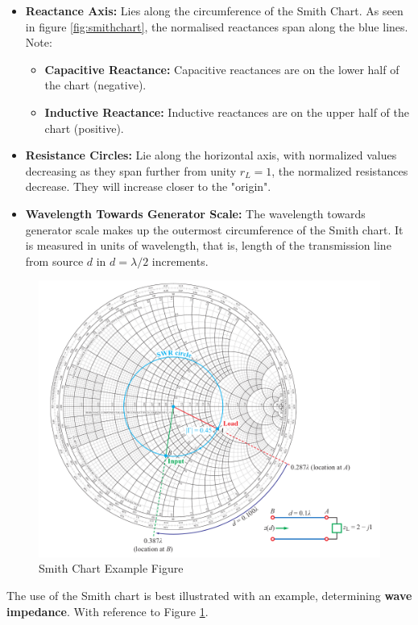 \documentclass{book}
\begin{document}
\begin{itemize}
	\item \textbf{Reactance Axis:} Lies along the circumference of the Smith Chart. As seen in figure \ref{fig:smithchart}, the normalised reactances span along the blue lines. Note:
	\begin{itemize}
		\item \textbf{Capacitive Reactance:} Capacitive reactances are on the lower half of the chart (negative).
		\item \textbf{Inductive Reactance:} Inductive reactances are on the upper half of the chart (positive).
	\end{itemize}
	\item \textbf{Resistance Circles:} Lie along the horizontal axis, with normalized values decreasing as they span further from unity $r_L = 1$, the normalized resistances decrease. They will increase closer to the  "origin".
	\item \textbf{Wavelength Towards Generator Scale:} The wavelength towards generator scale makes up the outermost circumference of the Smith chart. It is measured in units of wavelength, that is, length of the transmission line from source $d$ in $d=\lambda/2$ increments.
\end{itemize}

\begin{figure}[h]
	\centering
	\includegraphics[width=0.5\linewidth]{Screenshots/smith_chart1}
	\caption{Smith Chart Example Figure}
	\label{fig:smithchart1}
\end{figure}

The use of the Smith chart is best illustrated with an example, determining \textbf{wave impedance}. With reference to Figure \ref{fig:smithchart1}.
\end{document}
